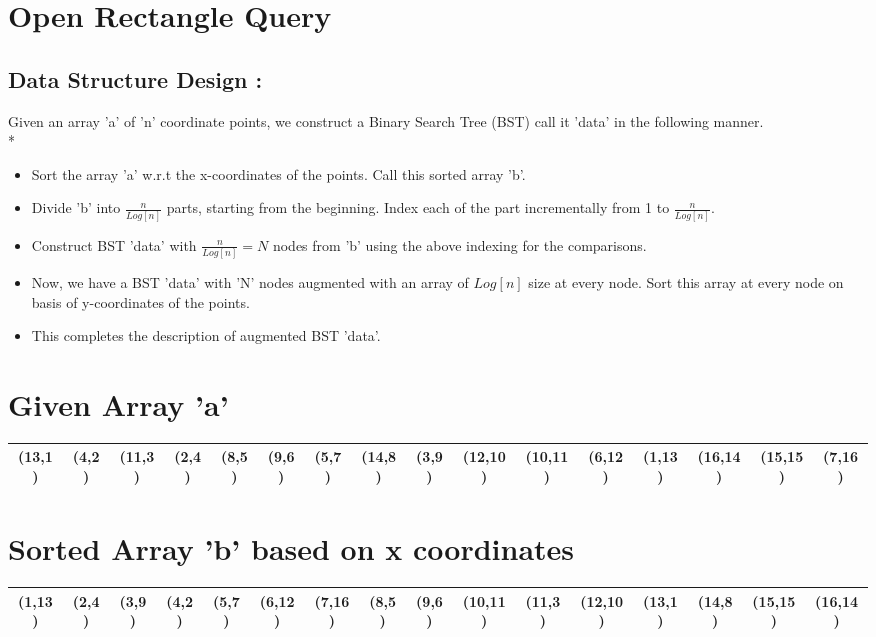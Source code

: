 \documentclass{article}
\begin{document}
\section{ Open Rectangle Query }
\subsection{Data Structure Design : } 
Given an array 'a' of 'n' coordinate points, we construct a Binary Search Tree (BST) call it 'data' in the following manner.\\*
\begin{itemize}
\item Sort the array 'a' w.r.t the x-coordinates of the points. Call this sorted array 'b'.
\item Divide 'b' into $ \frac{n}{Log[n]} $ parts, starting from the beginning. Index each of the part incrementally from 1 to $ \frac{n}{Log[n]} $. 
\item Construct BST 'data' with $ \frac{n}{Log[n]} = N $ nodes from 'b' using the above indexing for the comparisons.
\item Now, we have a BST 'data' with 'N' nodes augmented with an array of $Log[n]$ size at every node. Sort this array at every node on basis of y-coordinates of the points.
\item This completes the description of augmented BST 'data'.
\end{itemize}
\section*{Given Array 'a'}
\hspace{-4.8cm}
\begin{tabular}{ |c|c|c|c|c|c|c|c|c|c|c|c|c|c|c|c|}
\hline
\cellcolor{red} (13,1) & (4,2) & (11,3) & (2,4) & \cellcolor{red} (8,5) & (9,6) & (5,7) & (14,8) & \cellcolor{red} (3,9) & (12,10) & (10,11) & (6,12) & \cellcolor{red} (1,13) & (16,14) & (15,15) & (7,16) \\ \hline
\end{tabular}
\section*{Sorted Array 'b' based on x coordinates}
\hspace{-4.8cm}
\begin{tabular}{ |c|c|c|c|c|c|c|c|c|c|c|c|c|c|c|c|}
\hline
\cellcolor{red} (1,13) & (2,4) & (3,9) & (4,2) & \cellcolor{red} (5,7) & (6,12) & (7,16) & (8,5) & \cellcolor{red} (9,6) & (10,11) & (11,3) & (12,10) & \cellcolor{red} (13,1) & (14,8) & (15,15) & (16,14) \\ \hline
\end{tabular}
\end{document}
